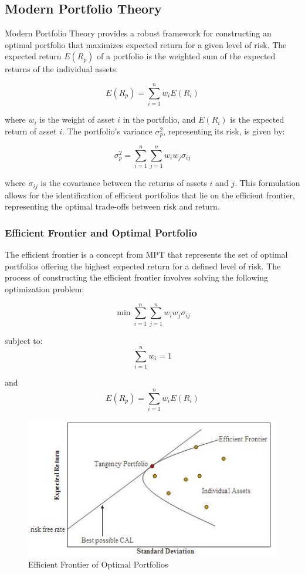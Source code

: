 \subsection{Modern Portfolio Theory}
Modern Portfolio Theory provides a robust framework for constructing an optimal portfolio that maximizes expected return for a given level of risk. The expected return \( E(R_p) \) of a portfolio is the weighted sum of the expected returns of the individual assets:

\[
E(R_p) = \sum_{i=1}^{n} w_i E(R_i)
\]

where \( w_i \) is the weight of asset \( i \) in the portfolio, and \( E(R_i) \) is the expected return of asset \( i \). The portfolio’s variance \( \sigma^2_p \), representing its risk, is given by:

\[
\sigma^2_p = \sum_{i=1}^{n} \sum_{j=1}^{n} w_i w_j \sigma_{ij}
\]

where \( \sigma_{ij} \) is the covariance between the returns of assets \( i \) and \( j \). This formulation allows for the identification of efficient portfolios that lie on the efficient frontier, representing the optimal trade-offs between risk and return.

\subsubsection{Efficient Frontier and Optimal Portfolio}
The efficient frontier is a concept from MPT that represents the set of optimal portfolios offering the highest expected return for a defined level of risk. The process of constructing the efficient frontier involves solving the following optimization problem:

\[
\min \sum_{i=1}^{n} \sum_{j=1}^{n} w_i w_j \sigma_{ij}
\]

subject to:
\[
\sum_{i=1}^{n} w_i = 1
\]

and
\[
E(R_p) = \sum_{i=1}^{n} w_i E(R_i)
\]

\begin{figure}[h]
\centering
\includegraphics[width=\linewidth]{efficient_frontier.png} 
\caption{Efficient Frontier of Optimal Portfolios}
\label{fig:efficient_frontier}
\end{figure}

